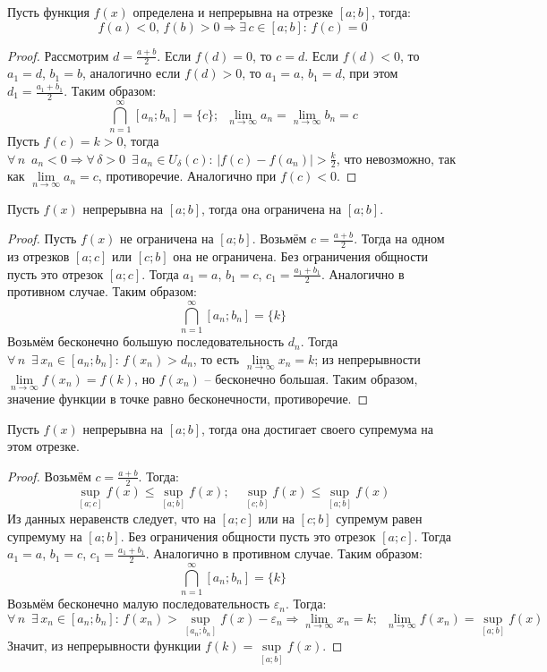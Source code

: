 \documentclass[12pt]{article}
\begin{document}
\begin{theorem}
    Пусть функция $f(x)$ определена и непрерывна на отрезке $\left[a;b\right]$, тогда:
    $$f(a)<0,\,f(b)>0\Longrightarrow\exists\,c\in \left[a;b\right]:\,f(c)=0$$
\end{theorem}
\begin{proof}
    Рассмотрим $d=\frac{a+b}{2}$. Если $f(d)=0$, то $c=d$. Если $f(d)<0$, то $a_1=d$, $b_1=b$, аналогично если $f(d)>0$, то $a_1=a$, $b_1=d$, при этом $d_1=\frac{a_1+b_1}{2}$. Таким образом:
    $$\bigcap_{n=1}^\infty\left[a_n;b_n\right]=\{c\};\enspace \lim_{n\to\infty}a_n=\lim_{n\to\infty}b_n=c$$
    Пусть $f(c)=k>0$, тогда $\forall\,n\enspace a_n <0\Longrightarrow\forall\,\delta>0\enspace\exists\,a_n\in U_\delta(c):\,|f(c)-f(a_n)|>\frac{k}{2}$, что невозможно, так как $\lim\limits_{n\to\infty}a_n=c$, противоречие. Аналогично при $f(c)<0$.
\end{proof}
\begin{theorem}
    Пусть $f(x)$ непрерывна на $\left[a;b\right]$, тогда она ограничена на $\left[a;b\right]$.
\end{theorem}
\begin{proof}
    Пусть $f(x)$ не ограничена на $\left[a;b\right]$. Возьмём $c=\frac{a+b}{2}$. Тогда на одном из отрезков $\left[a;c\right]$ или $\left[c;b\right]$ она не ограничена. Без ограничения общности пусть это отрезок $\left[a;c\right]$. Тогда $a_1=a$, $b_1=c$, $c_1=\frac{a_1+b_1}{2}$. Аналогично в противном случае. Таким образом:
    $$\bigcap_{n=1}^\infty\left[a_n;b_n\right]=\{k\}$$
    Возьмём бесконечно большую последовательность $d_n$. Тогда $\forall\, n\enspace  \exists\,x_n\in \left[a_n;b_n\right]:\,f(x_n)>d_n$, то есть $\lim\limits_{n\to\infty}x_n=k$; из непрерывности $\lim\limits_{n\to\infty}f(x_n)=f(k)$, но $f(x_n)$ -- бесконечно большая. Таким образом, значение функции в точке равно бесконечности, противоречие.
\end{proof}
\begin{theorem}
    Пусть $f(x)$ непрерывна на $\left[a;b\right]$, тогда она достигает своего супремума на этом отрезке.
\end{theorem}
\begin{proof}
    Возьмём $c=\frac{a+b}{2}$. Тогда:
    $$\sup_{\left[a;c\right]}f(x)\leq \sup_{\left[a;b\right]}f(x);\quad \sup_{\left[c;b\right]}f(x)\leq \sup_{\left[a;b\right]}f(x)$$
    Из данных неравенств следует, что на $\left[a;c\right]$ или на $\left[c;b\right]$ супремум равен супремуму на $\left[a;b\right]$. Без ограничения общности пусть это отрезок $\left[a;c\right]$. Тогда $a_1=a$, $b_1=c$, $c_1=\frac{a_1+b_1}{2}$. Аналогично в противном случае. Таким образом:
    $$\bigcap_{n=1}^\infty\left[a_n;b_n\right]=\{k\}$$
    Возьмём бесконечно малую последовательность $\varepsilon_n$. Тогда: 
    $$\forall\, n\enspace  \exists\,x_n\in \left[a_n;b_n\right]:\,f(x_n)>\sup\limits_{\left[a_n;b_n\right]}f(x)-\varepsilon_n\Longrightarrow\lim\limits_{n\to\infty}x_n=k;\enspace \lim\limits_{n\to\infty}f(x_n)=\sup\limits_{\left[a;b\right]}f(x)$$
    Значит, из непрерывности функции $f(k)=\sup\limits_{\left[a;b\right]}f(x)$.
\end{proof}
\end{document}
